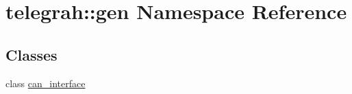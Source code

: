 \hypertarget{namespacetelegrah_1_1gen}{}\section{telegrah\+:\+:gen Namespace Reference}
\label{namespacetelegrah_1_1gen}
\subsection*{Classes}
\begin{DoxyCompactItemize}
\item 
class \hyperlink{classtelegrah_1_1gen_1_1can__interface}{can\+\_\+interface}
\end{DoxyCompactItemize}
